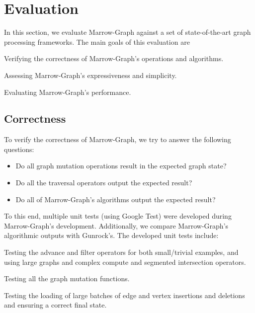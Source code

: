 %

\glsresetall
\chapter{Evaluation}


In this section, we evaluate Marrow-Graph against a set of state-of-the-art graph processing frameworks. The main goals of this evaluation are
\begin{enumerate*}
    \item Verifying the correctness of Marrow-Graph's operations and algorithms.
    \item Assessing Marrow-Graph's expressiveness and simplicity.
    \item Evaluating Marrow-Graph's performance.
\end{enumerate*}

\section{Correctness}

To verify the correctness of Marrow-Graph, we try to answer the following questions:
\begin{itemize}
    \item Do all graph mutation operations result in the expected graph state?
    \item Do all the traversal operators output the expected result?
    \item Do all of Marrow-Graph's algorithms output the expected result?
\end{itemize}

To this end, multiple unit tests (using Google Test) were developed during Marrow-Graph's development. Additionally, we compare Marrow-Graph's algorithmic outputs with Gunrock's. The developed unit tests include:
\begin{enumerate*}
    \item Testing the advance and filter operators for both small/trivial examples, and using large graphs and complex compute and segmented intersection operators.
    \item Testing all the graph mutation functions.
    \item Testing the loading of large batches of edge and vertex insertions and deletions and ensuring a correct final state.
\end{enumerate*}

